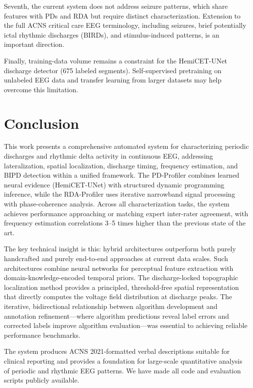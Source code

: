 \documentclass{iopjournal}
\begin{document}
Seventh, the current system does not address seizure patterns, which share features with PDs and RDA but require distinct characterization. Extension to the full ACNS critical care EEG terminology, including seizures, brief potentially ictal rhythmic discharges (BIRDs), and stimulus-induced patterns, is an important direction.

Finally, training-data volume remains a constraint for the HemiCET-UNet discharge detector (675 labeled segments). Self-supervised pretraining on unlabeled EEG data and transfer learning from larger datasets may help overcome this limitation.

\section{Conclusion}
\label{sec:conclusion}

This work presents a comprehensive automated system for characterizing periodic discharges and rhythmic delta activity in continuous EEG, addressing lateralization, spatial localization, discharge timing, frequency estimation, and BIPD detection within a unified framework. The PD-Profiler combines learned neural evidence (HemiCET-UNet) with structured dynamic programming inference, while the RDA-Profiler uses iterative narrowband signal processing with phase-coherence analysis. Across all characterization tasks, the system achieves performance approaching or matching expert inter-rater agreement, with frequency estimation correlations 3--5 times higher than the previous state of the art.

The key technical insight is this: hybrid architectures outperform both purely handcrafted and purely end-to-end approaches at current data scales. Such architectures combine neural networks for perceptual feature extraction with domain-knowledge-encoded temporal priors. The discharge-locked topographic localization method provides a principled, threshold-free spatial representation that directly computes the voltage field distribution at discharge peaks. The iterative, bidirectional relationship between algorithm development and annotation refinement---where algorithm predictions reveal label errors and corrected labels improve algorithm evaluation---was essential to achieving reliable performance benchmarks.

The system produces ACNS 2021-formatted verbal descriptions suitable for clinical reporting and provides a foundation for large-scale quantitative analysis of periodic and rhythmic EEG patterns. We have made all code and evaluation scripts publicly available.
\end{document}
